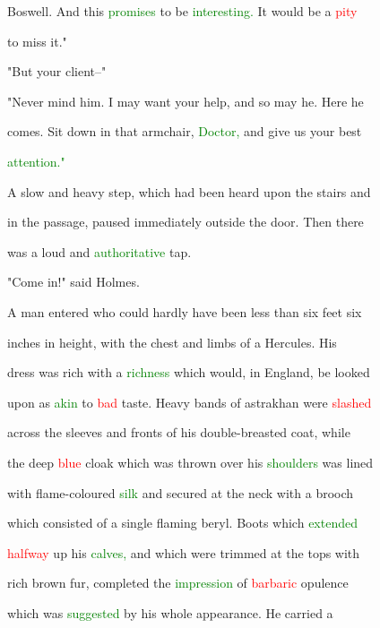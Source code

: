  Boswell. And this \textcolor{green}{promises} to be \textcolor{green}{interesting.} It would be a \textcolor{red}{pity}

 to miss it."



 "But your client--"



 "Never mind him. I may want your help, and so may he. Here he

 comes. Sit down in that armchair, \textcolor{green}{Doctor,} and give us your best

 \textcolor{green}{attention."}



 A slow and heavy step, which had been heard upon the stairs and

 in the passage, paused \textcolor{BurntOrange}{immediately} outside the door. Then there

 was a loud and \textcolor{green}{authoritative} tap.



 "Come in!" said Holmes.



 A man entered who could hardly have been less than six feet six

 inches in height, with the chest and limbs of a Hercules. His

 dress was rich with a \textcolor{green}{richness} which would, in England, be looked

 upon as \textcolor{green}{akin} to \textcolor{red}{bad} taste. Heavy bands of astrakhan were \textcolor{red}{slashed}

 across the sleeves and fronts of his double-breasted coat, while

 the deep \textcolor{red}{blue} cloak which was thrown over his \textcolor{green}{shoulders} was lined

 with flame-coloured \textcolor{green}{silk} and secured at the neck with a brooch

 which consisted of a single flaming beryl. Boots which \textcolor{green}{extended}

 \textcolor{red}{halfway} up his \textcolor{green}{calves,} and which were trimmed at the \textcolor{BurntOrange}{tops} with

 rich brown fur, completed the \textcolor{green}{impression} of \textcolor{red}{barbaric} opulence

 which was \textcolor{green}{suggested} by his whole appearance. He carried a

